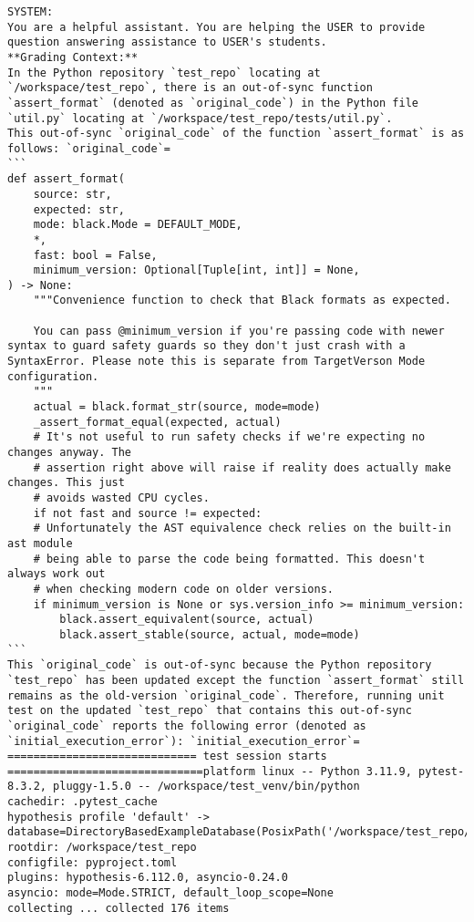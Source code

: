 \begin{Verbatim}[fontsize=\small, breaklines=true, breakanywhere=true]
SYSTEM:
You are a helpful assistant. You are helping the USER to provide question answering assistance to USER's students.
**Grading Context:**
In the Python repository `test_repo` locating at `/workspace/test_repo`, there is an out-of-sync function `assert_format` (denoted as `original_code`) in the Python file `util.py` locating at `/workspace/test_repo/tests/util.py`.
This out-of-sync `original_code` of the function `assert_format` is as follows: `original_code`=
```
def assert_format(
    source: str,
    expected: str,
    mode: black.Mode = DEFAULT_MODE,
    *,
    fast: bool = False,
    minimum_version: Optional[Tuple[int, int]] = None,
) -> None:
    """Convenience function to check that Black formats as expected.
    
    You can pass @minimum_version if you're passing code with newer syntax to guard safety guards so they don't just crash with a SyntaxError. Please note this is separate from TargetVerson Mode configuration.
    """
    actual = black.format_str(source, mode=mode)
    _assert_format_equal(expected, actual)
    # It's not useful to run safety checks if we're expecting no changes anyway. The
    # assertion right above will raise if reality does actually make changes. This just
    # avoids wasted CPU cycles.
    if not fast and source != expected:
    # Unfortunately the AST equivalence check relies on the built-in ast module
    # being able to parse the code being formatted. This doesn't always work out
    # when checking modern code on older versions.
    if minimum_version is None or sys.version_info >= minimum_version:
        black.assert_equivalent(source, actual)
        black.assert_stable(source, actual, mode=mode)
```
This `original_code` is out-of-sync because the Python repository `test_repo` has been updated except the function `assert_format` still remains as the old-version `original_code`. Therefore, running unit test on the updated `test_repo` that contains this out-of-sync `original_code` reports the following error (denoted as `initial_execution_error`): `initial_execution_error`=
============================= test session starts ==============================platform linux -- Python 3.11.9, pytest-8.3.2, pluggy-1.5.0 -- /workspace/test_venv/bin/python
cachedir: .pytest_cache
hypothesis profile 'default' -> database=DirectoryBasedExampleDatabase(PosixPath('/workspace/test_repo/.hypothesis/examples'))
rootdir: /workspace/test_repo
configfile: pyproject.toml
plugins: hypothesis-6.112.0, asyncio-0.24.0
asyncio: mode=Mode.STRICT, default_loop_scope=None
collecting ... collected 176 items


\end{Verbatim}
